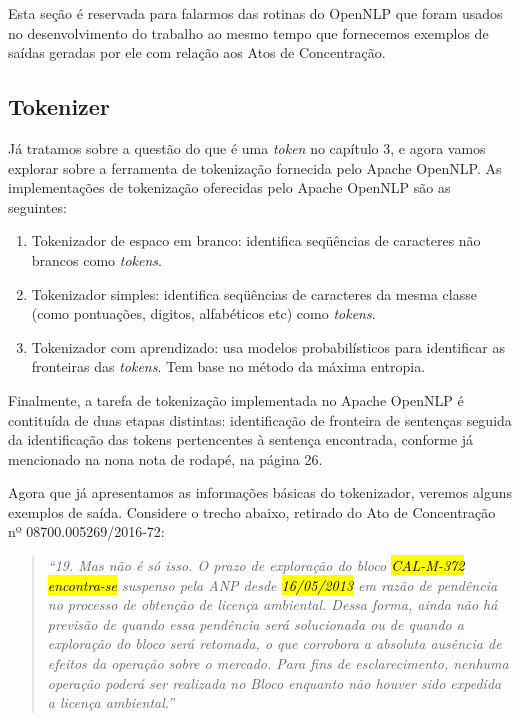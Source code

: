 \documentclass[11pt]{report}
\newcommand{\quotes}[1]{``#1''}
\begin{document}
Esta seção é reservada para falarmos das rotinas do OpenNLP que foram usados no desenvolvimento do trabalho
ao mesmo tempo que fornecemos exemplos de saídas geradas por ele com relação aos Atos de Concentração.


\subsection{Tokenizer}

\indent\indent Já tratamos sobre a questão do que é uma \textit{token} no capítulo 3, e agora vamos explorar sobre a ferramenta de
tokenização fornecida pelo Apache OpenNLP. As implementações de tokenização oferecidas pelo Apache OpenNLP são as seguintes:

\begin{enumerate}[label=\textbf{{\Roman*.}}]
  \item Tokenizador de espaco em branco: identifica seqüências de caracteres não brancos como \textit{tokens}.
  \item Tokenizador simples: identifica seqüências de caracteres da mesma classe (como pontuações, digitos, alfabéticos etc) como \textit{tokens}.
  \item Tokenizador com aprendizado: usa modelos probabilísticos para identificar as fronteiras das \textit{tokens}. Tem base no método da máxima entropia.
\end{enumerate}

Finalmente, a tarefa de tokenização implementada no Apache OpenNLP é contituída de duas etapas distintas: identificação de fronteira de sentenças seguida da identificação das
tokens pertencentes à sentença encontrada, conforme já mencionado na nona nota de rodapé, na página 26.

Agora que já apresentamos as informações básicas do tokenizador, veremos alguns exemplos de saída. Considere o trecho abaixo, retirado do Ato de Concentração nº 08700.005269/2016-72:

\begin{quote}
  \textit{\quotes{19. Mas não é só isso. O prazo de exploração do bloco \hl{CAL-M-372} \hl{encontra-se} suspenso pela ANP desde \hl{16/05/2013} em razão de pendência no processo de obtenção de licença ambiental. Dessa forma, ainda não há previsão de quando essa pendência será solucionada ou de quando a exploração do bloco será retomada, o que corrobora a absoluta ausência de efeitos da operação sobre o mercado. Para fins de esclarecimento, nenhuma operação poderá ser realizada no Bloco enquanto não houver sido expedida a licença ambiental.}}
\end{quote}
\end{document}
